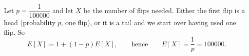 Let $p=\dfrac{1}{100000}$ and let $X$ be the number of flips needed. Either the first flip is a head (probability $p$, one flip), or it is a tail and we start over having used one flip. So
\[E[X]=1+(1-p)E[X],\qquad\text{hence}\qquad E[X]=\dfrac{1}{p}=\boxed{100000}.\]
